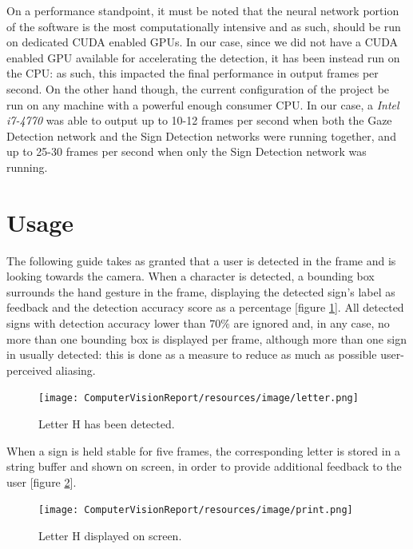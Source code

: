 \documentclass[a4paper, 12pt]{article}
\begin{document}
On a performance standpoint, it must be noted that the neural network portion of the software is the most computationally intensive and as such, should be run on dedicated CUDA enabled GPUs.\linebreak
In our case, since we did not have a CUDA enabled GPU available for accelerating the detection, it has been instead run on the CPU: as such, this impacted the final performance in output frames per second. On the other hand though, the current configuration of the project be run on any machine with a powerful enough consumer CPU.\linebreak
In our case, a \textit{Intel i7-4770} was able to output up to 10-12 frames per second when both the Gaze Detection network and the Sign Detection networks were running together, and up to 25-30 frames per second when only the Sign Detection network was running.\linebreak

\section{Usage}
\label{Usage}
The following guide takes as granted that a user is detected in the frame and is looking towards the camera.\linebreak
When a character is detected, a bounding box surrounds the hand gesture in the frame, displaying the detected sign's label as feedback and the detection accuracy score as a percentage [figure \ref{fig:letter}].\linebreak
All detected signs with detection accuracy lower than $70\%$ are ignored and, in any case, no more than one bounding box is displayed per frame, although more than one sign in usually detected: this is done as a measure to reduce as much as possible user-perceived aliasing.\linebreak

\begin{figure}[!h]
    \centering
    \texttt{[image: ComputerVisionReport/resources/image/letter.png]} \caption{Letter H has been detected.} \label{fig:letter}
\end{figure}

When a sign is held stable for five frames, the corresponding letter is stored in a string buffer and shown on screen, in order to provide additional feedback to the user [figure \ref{fig:print}].\linebreak

\begin{figure}[H]
    \centering
    \texttt{[image: ComputerVisionReport/resources/image/print.png]} \caption{Letter H displayed on screen.} \label{fig:print}
\end{figure}
\end{document}
